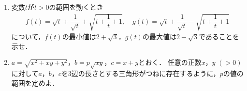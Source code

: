 \documentclass[../../main.tex]{subfiles}
\begin{document}
\begin{enumerate}
  \item 変数$t$が$t>0$の範囲を動くとき
    \begin{align*}
      f(t)=\sqrt{t}+\dfrac{1}{\sqrt{t}}+\sqrt{t+\dfrac{1}{t}+1},
      \quad
      g(t)=\sqrt{t}+\dfrac{1}{\sqrt{t}}-\sqrt{t+\dfrac{1}{t}+1}
    \end{align*}
    について，$f(t)$の最小値は$2+\sqrt3$，$g(t)$の最大値は$2-\sqrt3$であることを示せ．
  \item $a=\sqrt{x^2+xy+y^2}$，$b=p\sqrt{xy}$，$c=x+y$とおく．
    任意の正数$x$，$y$ $(>0)$に対して$a$，$b$，$c$を3辺の長さとする三角形がつねに存在するように，$p$の値の範囲を定めよ．
\end{enumerate}
\end{document}
